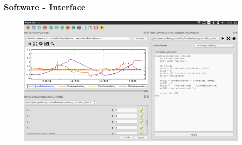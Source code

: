 \documentclass{beamer}
\begin{document}
\begin{frame}
\frametitle{Software - Interface}
\begin{figure}
\includegraphics[width=\linewidth]{./img/screenshot/sc1.png}
\end{figure}
\end{frame}


\end{document}
